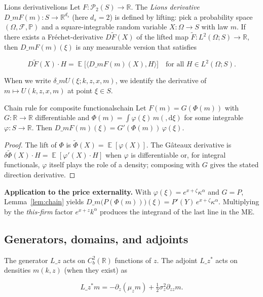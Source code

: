 \documentclass[11pt,letterpaper,oneside]{article}
\numberwithin{equation}{section}
\DeclareMathOperator{\E}{\mathbb{E}}
\newcommand{\R}{\mathbb{R}}
\newcommand{\1}{\mathbf{1}}
\newcommand{\diff}{,\mathrm{d}}
\newcommand{\Lz}{L\_z}
\newcommand{\Lzadj}{L\_z^{\!*}}
\newcommand{\dmU}{\delta\_m U}
\newcommand{\Dm}{D\_m}
\newcommand{\ip}[2]{\langle #1,#2\rangle}
\begin{document}
\begin{definition}{Lions derivative}{lions}
Let $F:\mathcal P_2(S)\to\R$. The \emph{Lions derivative} $\Dm F(m):S\to\R^{d_s}$ (here $d_s=2$) is defined by lifting: pick a probability space $(\Omega,\mathcal F,\mathbb P)$ and a square-integrable random variable $X:\Omega\to S$ with law $m$. If there exists a Fréchet-derivative $D\tilde F(X)$ of the lifted map $\tilde F: L^2(\Omega;S)\to\R$, then $\Dm F(m)(\xi)$ is any measurable version that satisfies

$$
D\tilde F(X)\cdot H = \E\big[\ip{ \Dm F(m)(X)}{H}\big]\quad\text{for all }H\in L^2(\Omega;S).
$$

When we write $\dmU(\xi;k,z,x,m)$, we identify the derivative of $m\mapsto U(k,z,x,m)$ at point $\xi\in S$.
\end{definition}

\begin{lemma}{Chain rule for composite functionals}{chain}
Let $F(m)=G(\Phi(m))$ with $G:\R\to\R$ differentiable and $\Phi(m)=\int \varphi(\xi)\,m(\diff\xi)$ for some integrable $\varphi:S\to\R$. Then $\Dm F(m)(\xi)=G'(\Phi(m))\,\varphi(\xi)$.
\end{lemma}

\begin{proof}
The lift of $\Phi$ is $\tilde\Phi(X)=\E[\varphi(X)]$. The Gâteaux derivative is $\delta \tilde\Phi(X)\cdot H=\E[\varphi'(X)\cdot H]$ when $\varphi$ is differentiable or, for integral functionals, $\varphi$ itself plays the role of a density; composing with $G$ gives the stated direction derivative.
\end{proof}

\begin{tcolorbox}[mathstyle]
\textbf{Application to the price externality.} With $\varphi(\xi)=e^{x+\zeta}\kappa^\alpha$ and $G=P$, Lemma~\ref{lem:chain} yields
$\Dm\big(P(\Phi(m))\big)(\xi)=P'(Y)\,e^{x+\zeta}\kappa^\alpha$.
Multiplying by the \emph{this-firm} factor $e^{x+z}k^\alpha$ produces the integrand of the last line in the ME.
\end{tcolorbox}

\subsection{Generators, domains, and adjoints}
The generator $\Lz$ acts on $C_b^2(\R)$ functions of $z$. The adjoint $\Lzadj$ acts on densities $m(k,z)$ (when they exist) as

$$
\Lzadj m = -\partial_z(\mu_z m) + \tfrac12 \sigma_z^2 \partial_{zz} m .
$$
\end{document}
